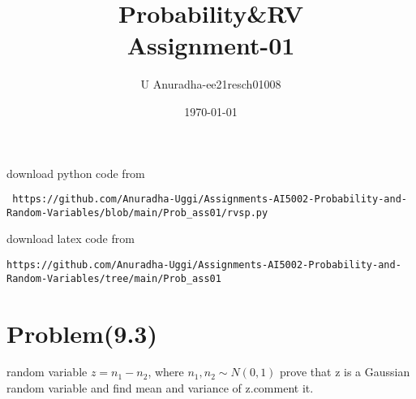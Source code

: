 \documentclass[journal,12pt,twocolumn]{IEEEtran}
\title{Probability\&RV \\ Assignment-01}
\author{U Anuradha-ee21resch01008}
\date{\today}
\begin{document}
\maketitle
\newpage
\bigskip
\renewcommand{\thefigure}{\theenumi}
\renewcommand{\thetable}{\theenumi}
download python code from
\begin{lstlisting}
 https://github.com/Anuradha-Uggi/Assignments-AI5002-Probability-and-Random-Variables/blob/main/Prob_ass01/rvsp.py
\end{lstlisting}
download latex code from
\begin{lstlisting}
https://github.com/Anuradha-Uggi/Assignments-AI5002-Probability-and-Random-Variables/tree/main/Prob_ass01
\end{lstlisting}


\section{Problem(9.3)}
random variable $z=n_1-n_2$, where $n_1,n_2\sim N(0,1)$
prove that z is a Gaussian random variable and find mean and variance of z.comment it.
\end{document}
